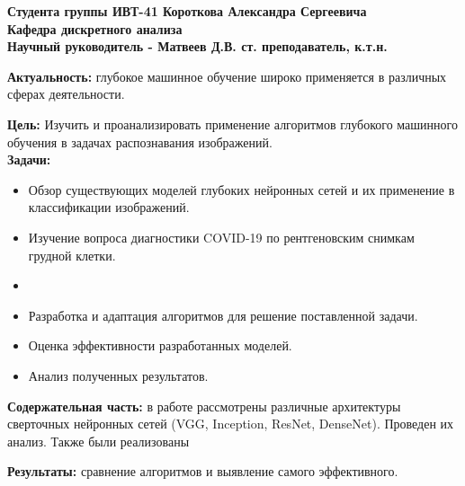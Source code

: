 \documentclass[xetex, a4paper,12pt]{extarticle}
\begin{document}


\vspace{2em}
\vspace{2em}

\begin{flushleft}
\textbf{
    Студента группы ИВТ-41 Короткова Александра Сергеевича\\
    Кафедра дискретного анализа\\
    Научный руководитель - Матвеев Д.В. ст. преподаватель, к.т.н.
}
\vspace{2em}
    
\textbf{Актуальность:} глубокое машинное обучение широко применяется в различных сферах деятельности.
\vspace{1em}

\textbf{Цель:} Изучить и проанализировать применение алгоритмов глубокого машинного обучения в задачах распознавания изображений. \\

\textbf{Задачи: }
\begin{itemize}
    \item Обзор существующих моделей глубоких нейронных сетей и их применение в классификации изображений.
    \item Изучение вопроса диагностики COVID-19 по рентгеновским снимкам грудной клетки. 
    \item 
    \item Разработка и адаптация алгоритмов для решение поставленной задачи.
    \item Оценка эффективности разработанных моделей.
    \item Анализ полученных результатов.
\end{itemize}
\vspace{1em}

\textbf{Содержательная часть:} в работе рассмотрены различные архитектуры сверточных нейронных сетей (VGG, Inception, ResNet, DenseNet). Проведен их анализ. Также были реализованы 
\vspace{1em}

\textbf{Результаты:} сравнение алгоритмов и выявление самого эффективного.
\vspace{1em}

\end{flushleft}
\end{document}

